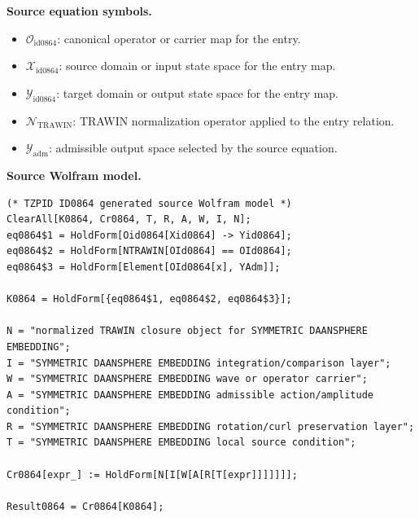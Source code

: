 \begin{minipage}[t]{0.49\linewidth}
\begingroup
\small
\raggedright
\textbf{Source equation symbols.}\par
\begin{itemize}[leftmargin=1.35em,itemsep=1pt,topsep=1pt,parsep=0pt]
    \item $\mathcal{O}_{\mathrm{id0864}}$: canonical operator or carrier map for the entry.
    \item $\mathcal{X}_{\mathrm{id0864}}$: source domain or input state space for the entry map.
    \item $\mathcal{Y}_{\mathrm{id0864}}$: target domain or output state space for the entry map.
    \item $\mathcal{N}_{\mathrm{TRAWIN}}$: TRAWIN normalization operator applied to the entry relation.
    \item $\mathcal{Y}_{\mathrm{adm}}$: admissible output space selected by the source equation.
\end{itemize}
\endgroup
\end{minipage}\hfill
\begin{minipage}[t]{0.47\linewidth}
\begingroup
\scriptsize
\raggedright
\textbf{Source Wolfram model.}\par
\begin{Verbatim}[fontsize=\tiny,breaklines=true,breakanywhere=true]
(* TZPID ID0864 generated source Wolfram model *)
ClearAll[K0864, Cr0864, T, R, A, W, I, N];
eq0864$1 = HoldForm[Oid0864[Xid0864] -> Yid0864];
eq0864$2 = HoldForm[NTRAWIN[OId0864] == OId0864];
eq0864$3 = HoldForm[Element[OId0864[x], YAdm]];

K0864 = HoldForm[{eq0864$1, eq0864$2, eq0864$3}];

N = "normalized TRAWIN closure object for SYMMETRIC DAANSPHERE EMBEDDING";
I = "SYMMETRIC DAANSPHERE EMBEDDING integration/comparison layer";
W = "SYMMETRIC DAANSPHERE EMBEDDING wave or operator carrier";
A = "SYMMETRIC DAANSPHERE EMBEDDING admissible action/amplitude condition";
R = "SYMMETRIC DAANSPHERE EMBEDDING rotation/curl preservation layer";
T = "SYMMETRIC DAANSPHERE EMBEDDING local source condition";

Cr0864[expr_] := HoldForm[N[I[W[A[R[T[expr]]]]]]];

Result0864 = Cr0864[K0864];
\end{Verbatim}
\endgroup
\end{minipage}

